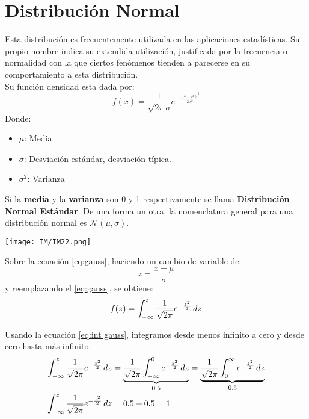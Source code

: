 \documentclass[
	12pt, %
	fleqn, %
	a4paper, %
]{LegrandOrangeBook}
\begin{document}
\section{Distribución Normal}
\begin{definition}
Esta distribución es frecuentemente utilizada en las aplicaciones estadísticas. Su propio nombre indica su extendida utilización, justificada por la frecuencia o normalidad con la que ciertos fenómenos tienden a parecerse en su comportamiento a esta distribución.\\
Su función densidad esta dada por:
\begin{equation}
f(x)=\frac{1}{\sqrt{2\pi}\sigma}e^{-\frac{(x-\mu)^2}{2\sigma^2}}
\label{eq:gauss}
\end{equation}
Donde:
\begin{itemize}
\item $\mu$: Media
\item $\sigma$: Desviación estándar, desviación típica.
\item $\sigma^2$: Varianza
\end{itemize}
Si la \textbf{media} y la \textbf{varianza} son 0 y 1 respectivamente se llama \textbf{Distribución Normal Estándar}. De una forma un otra, la nomenclatura general para una distribución normal es $\mathcal{N}(\mu,\sigma)$.
\begin{center}
\texttt{[image: IM/IM22.png]}
\end{center}
\end{definition}
Sobre la ecuación \ref{eq:gauss}, haciendo un cambio de variable de:
\begin{equation}
z=\frac{x-\mu}{\sigma}
\label{eq:int gauss}
\end{equation}
y reemplazando el \ref{eq:gauss}, se obtiene:
\begin{displaymath}
f(z)=\int_{-\infty}^z\frac{1}{\sqrt{2\pi}}e^{-\frac{z^2}{2}}\mathop{}\!d z
\end{displaymath}
\begin{theorem}
Usando la ecuación \ref{eq:int gauss}, integramos desde menos infinito a cero y desde cero hasta más infinito:
\begin{align*}
\int_{-\infty}^z\frac{1}{\sqrt{2\pi}}e^{-\frac{z^2}{2}}\mathop{}\!d z&=\underbrace{\frac{1}{\sqrt{2\pi}}\int_{-\infty}^0e^{-\frac{z^2}{2}}\mathop{}\!d z}_{0.5}=\underbrace{\frac{1}{\sqrt{2\pi}}\int^{\infty}_0e^{-\frac{z^2}{2}}\mathop{}\!d z}_{0.5}\\
\int_{-\infty}^z\frac{1}{\sqrt{2\pi}}e^{-\frac{z^2}{2}}\mathop{}\!d z&=0.5+0.5=1
\end{align*}
\end{theorem}
\end{document}
